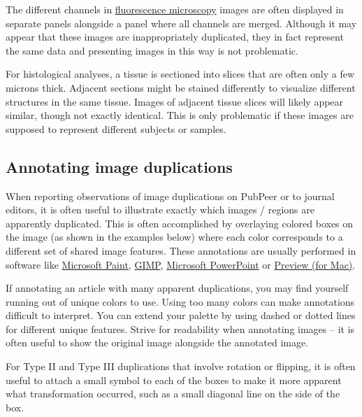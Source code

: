 \documentclass[letterpaper, 12pt]{article}
\begin{document}
The different channels in \href{https://en.wikipedia.org/wiki/Fluorescence_microscope}{fluorescence microscopy} images are often displayed in separate panels alongside a panel where all channels are merged. Although it may appear that these images are inappropriately duplicated, they in fact represent the same data and presenting images in this way is not problematic.

For histological analyses, a tissue is sectioned into slices that are often only a few microns thick. Adjacent sections might be stained differently to visualize different structures in the same tissue. Images of adjacent tissue slices will likely appear similar, though not exactly identical. This is only problematic if these images are supposed to represent different subjects or samples.

\subsection*{Annotating image duplications}

When reporting observations of image duplications on PubPeer or to journal editors, it is often useful to illustrate exactly which images / regions are apparently duplicated. This is often accomplished by overlaying colored boxes on the image (as shown in the examples below) where each color corresponds to a different set of shared image features. These annotations are usually performed in software like \href{https://www.microsoft.com/en-us/windows/paint}{Microsoft Paint}, \href{https://www.gimp.org/}{GIMP}, \href{https://www.microsoft.com/en-us/microsoft-365/powerpoint}{Microsoft PowerPoint} or \href{https://support.apple.com/guide/preview/welcome/mac}{Preview (for Mac)}. 

If annotating an article with many apparent duplications, you may find yourself running out of unique colors to use. Using too many colors can make annotations difficult to interpret. You can extend your palette by using dashed or dotted lines for different unique features. Strive for readability when annotating images -- it is often useful to show the original image alongside the annotated image.

For Type II and Type III duplications that involve rotation or flipping, it is often useful to attach a small symbol to each of the boxes to make it more apparent what transformation occurred, such as a small diagonal line on the side of the box. 
\end{document}
